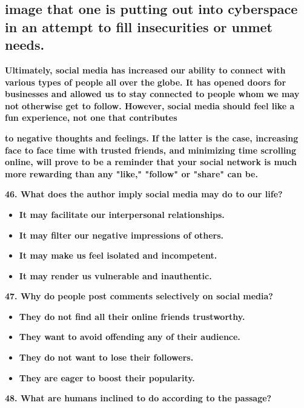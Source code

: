 \documentclass[UTF8,11pt]{ctexart}
\begin{document}
\subsection*{\textbf{image that one is putting out into cyberspace in an attempt to fill insecurities or unmet needs.}}


\textbf{Ultimately, social media has increased our ability to connect with various types of people all over the} \textbf{globe. It has opened doors for businesses and allowed us to stay connected to people whom we may not} \textbf{otherwise get to follow. However, social media should feel like a fun experience, not one that contributes}


\textbf{to negative thoughts and feelings. If the latter is the case, increasing face to face time with trusted} \textbf{friends, and minimizing time scrolling online, will prove to be a reminder that your social network is much} \textbf{more rewarding than any "like," "follow" or "share" can be.}


\textbf{46. What does the author imply social media may do to our life?}


\begin{itemize}[leftmargin=2em,itemsep=.2em,topsep=.4em]\item[A.] \textbf{It may facilitate our interpersonal relationships.}
\item[B.] \textbf{It may filter our negative impressions of others.}
\item[C.] \textbf{It may make us feel isolated and incompetent.}
\item[D.] \textbf{It may render us vulnerable and inauthentic.}
\end{itemize}

\textbf{47. Why do people post comments selectively on social media?}


\begin{itemize}[leftmargin=2em,itemsep=.2em,topsep=.4em]\item[A.] \textbf{They do not find all their online friends trustworthy.}
\item[B.] \textbf{They want to avoid offending any of their audience.}
\item[C.] \textbf{They do not want to lose their followers.}
\item[D.] \textbf{They are eager to boost their popularity.}
\end{itemize}

\textbf{48. What are humans inclined to do according to the passage?}
\end{document}
